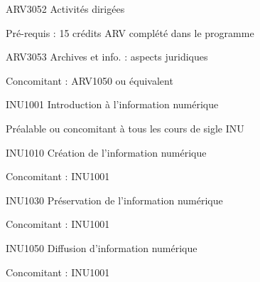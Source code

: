 \documentclass [12 pt]{article}
\begin{document}
                        
                        
                            
                                ARV3052 Activités dirigées
                            
                            
                                Pré-requis : 15 crédits ARV complété dans le
                                    programme
                            
                        
                        
                            
                                ARV3053 Archives et info. : aspects juridiques
                            
                            
                                Concomitant : ARV1050 ou équivalent
                            
                        
                        
                            
                                INU1001 Introduction à l'information numérique
                            
                            
                                Préalable ou concomitant à tous les cours de sigle INU
                            
                        
                        
                            
                                INU1010 Création de l'information numérique
                            
                            
                                Concomitant : INU1001
                            
                        
                        
                            
                                INU1030 Préservation de l'information numérique
                            
                            
                                Concomitant : INU1001
                            
                        
                        
                            
                                INU1050 Diffusion d'information numérique
                            
                            
                                Concomitant : INU1001
                            
\end{document}
